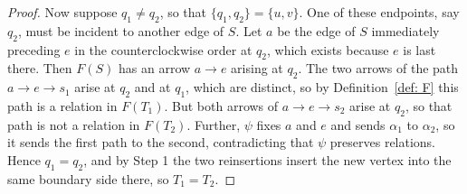 \documentclass[12pt]{amsart}
\theoremstyle{definition}
\theoremstyle{remark}
\numberwithin{equation}{section}
\begin{document}
\begin{proof}
Now suppose \(q_1 \neq q_2\), so that \(\{q_1,q_2\} = \{u,v\}\). One of these endpoints, say \(q_2\), must be incident to another edge of \(S\). Let \(a\) be the edge of \(S\) immediately preceding \(e\) in the counterclockwise order at \(q_2\), which exists because
\(e\) is last there. Then \(F(S)\) has an arrow \(a \to e\) arising at \(q_2\). The two arrows of the path \(a \to e \to s_1\) arise at \(q_2\) and at \(q_1\), which are distinct, so by Definition~\ref{def: F} this path is a relation in \(F(T_1)\). But both arrows of \(a \to e \to s_2\) arise at \(q_2\), so that path is not a relation in \(F(T_2)\). Further, \(\psi\) fixes \(a\) and \(e\) and sends \(\alpha_1\) to \(\alpha_2\),
so it sends the first path to the second, contradicting that \(\psi\) preserves relations. Hence \(q_1 = q_2\), and by Step 1 the two reinsertions insert the new vertex into the same boundary side there, so \(T_1 = T_2\).

\end{proof}
\end{document}
